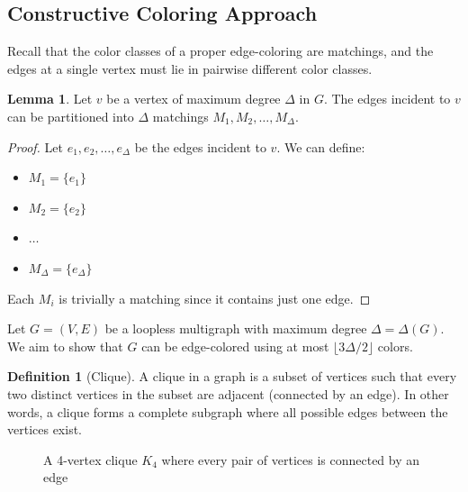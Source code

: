 \documentclass{article}
\theoremstyle{definition}
\newtheorem{lemma}{Lemma}
\newtheorem{definition}{Definition}
\begin{document}
\subsection*{Constructive Coloring Approach}

Recall that the color classes of a proper edge-coloring are matchings, and the edges at a single vertex must lie in pairwise different color classes.

\begin{lemma}
Let $v$ be a vertex of maximum degree $\Delta$ in $G$. The edges incident to $v$ can be partitioned into $\Delta$ matchings $M_1, M_2, \ldots, M_\Delta$.
\end{lemma}

\begin{proof}
Let $e_1, e_2, \ldots, e_\Delta$ be the edges incident to $v$. We can define:
\begin{itemize}
    \item $M_1 = \{e_1\}$
    \item $M_2 = \{e_2\}$
    \item $\ldots$
    \item $M_\Delta = \{e_\Delta\}$
\end{itemize}

Each $M_i$ is trivially a matching since it contains just one edge.
\end{proof}

Let $G = (V, E)$ be a loopless multigraph with maximum degree $\Delta = \Delta(G)$. We aim to show that $G$ can be edge-colored using at most $\lfloor 3\Delta/2 \rfloor$ colors.

\begin{definition}[Clique]
A clique in a graph is a subset of vertices such that every two distinct vertices in the subset are adjacent (connected by an edge). In other words, a clique forms a complete subgraph where all possible edges between the vertices exist.
\end{definition}

\begin{figure}[ht]
\centering
{}
\caption{A 4-vertex clique $K_4$ where every pair of vertices is connected by an edge}
\label{fig:clique-k4}
\end{figure}
\end{document}
